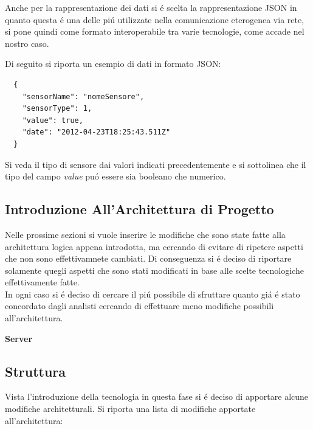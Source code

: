 Anche per la rappresentazione dei dati si \'e scelta la rappresentazione JSON in quanto questa \'e una delle pi\'u utilizzate nella comunicazione eterogenea via rete, si pone quindi come formato interoperabile tra varie tecnologie, come accade nel nostro caso.

Di seguito si riporta un esempio di dati in formato JSON:

\begin{lstlisting}
  {
    "sensorName": "nomeSensore",
    "sensorType": 1,
    "value": true,
    "date": "2012-04-23T18:25:43.511Z"
  }
\end{lstlisting}

Si veda il tipo di sensore dai valori indicati precedentemente e si sottolinea che il tipo del campo \textit{value} pu\'o essere sia booleano che numerico.

\subsection{Introduzione All'Architettura di Progetto}

Nelle prossime sezioni si vuole inserire le modifiche che sono state fatte alla architettura logica appena introdotta, ma cercando di evitare di ripetere aspetti che non sono effettivamnete cambiati. Di conseguenza si \'e deciso di riportare solamente quegli aspetti che sono stati modificati in base alle scelte tecnologiche effettivamente fatte.\\
In ogni caso si \'e deciso di cercare il pi\'u possibile di sfruttare quanto gi\'a \'e stato concordato dagli analisti cercando di effettuare meno modifiche possibili all'architettura.

\begin{center}
  \textbf{Server}
\end{center}

\subsection{Struttura}

Vista l'introduzione della tecnologia in questa fase si \'e deciso di apportare alcune modifiche architetturali. Si riporta una lista di modifiche apportate all'architettura:

